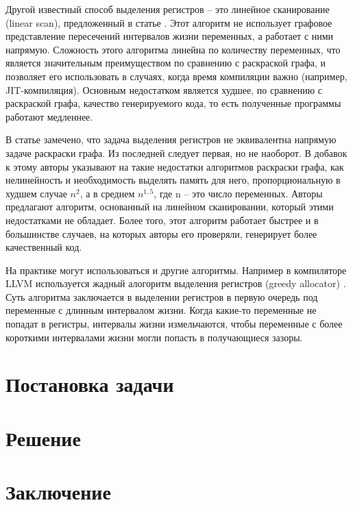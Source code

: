 \documentclass[a4paper,14pt]{extarticle}
\begin{document}
Другой известный способ выделения регистров -- это линейное сканирование (linear scan), предложенный в статье \cite{poletto_linear_1999}.
Этот алгоритм не использует графовое представление пересечений интервалов жизни переменных, а работает с ними напрямую.
Сложность этого алгоритма линейна по количеству переменных, что является значительным преимуществом по сравнению с раскраской графа,
и позволяет его использовать в случаях, когда время компиляции важно (например, JIT-компиляция).
Основным недостатком является худшее, по сравнению с раскраской графа, качество генерируемого кода, то есть полученные программы работают медленнее.

В статье \cite{krishnamurthi_extended_2007} замечено, что задача выделения регистров не эквивалентна напрямую задаче раскраски графа.
Из последней следует первая, но не наоборот.
В добавок к этому авторы указывают на такие недостатки алгоритмов раскраски графа,
как нелинейность и необходимость выделять память для него,
пропорциональную в худшем случае $n^2$, а в среднем $n^{1,5}$, где n -- это число переменных.
Авторы предлагают алгоритм, основанный на линейном сканировании, который этими недостатками не обладает.
Более того, этот алгоритм работает быстрее и в большинстве случаев, на которых авторы его проверяли, генерирует более качественный код.

На практике могут использоваться и другие алгоритмы.
Например в компиляторе LLVM используется жадный алогоритм выделения регистров (greedy allocator) \cite{llvm_greedy_2011}.
Суть алгоритма заключается в выделении регистров в первую очередь под переменные с длинным интервалом жизни.
Когда какие-то переменные не попадат в регистры, интервалы жизни измельчаются, чтобы переменные с более короткими интервалами жизни могли попасть в получающиеся зазоры.


\section{Постановка задачи}

\section{Решение}

\section{Заключение}

\newpage



\end{document}
